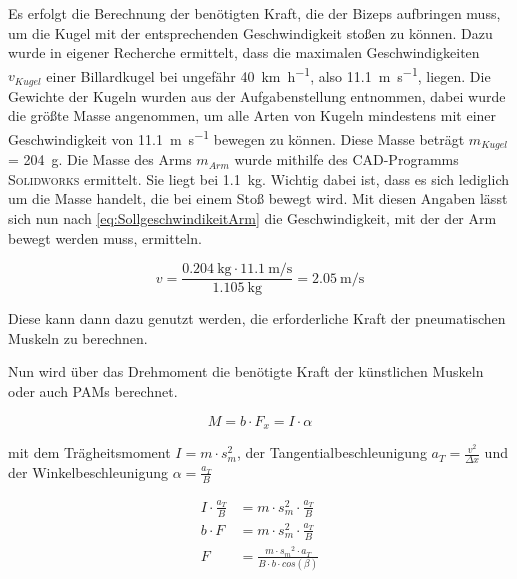 		Es erfolgt die Berechnung der benötigten Kraft, die der Bizeps aufbringen muss, um die Kugel mit der entsprechenden Geschwindigkeit stoßen zu können. 
		Dazu wurde in eigener Recherche ermittelt, dass die maximalen Geschwindigkeiten \(v_{Kugel}\) einer Billardkugel bei ungefähr \SI{40}{\kilo\metre\per\hour}, also \SI{11,1}{\metre\per\second}, liegen.
		Die Gewichte der Kugeln wurden aus der Aufgabenstellung entnommen, dabei wurde die größte Masse angenommen, um alle Arten von Kugeln mindestens mit einer Geschwindigkeit von \SI{11,1}{\metre\per\second} bewegen zu können.
		Diese Masse beträgt \(m_{Kugel}\) = \SI{204}{\gram}.
		Die Masse des Arms \(m_{Arm}\) wurde mithilfe des CAD-Programms \textsc{Solidworks} ermittelt. Sie liegt bei \SI{1,1}{\kilo\gram}.
		Wichtig dabei ist, dass es sich lediglich um die Masse handelt, die bei einem Stoß bewegt wird. 
		Mit diesen Angaben lässt sich nun nach \cref{eq:SollgeschwindikeitArm} die Geschwindigkeit, mit der der Arm bewegt werden muss, ermitteln. 

		\begin{equation}
			v= \frac{\SI{0,204}{\kilogram} \cdot \SI{11,1}{\metre\per\second}}{\SI{1,105}{\kilogram}} = \SI{2,05}{\metre\per\second}
			\label{eq:SollgeschwindikeitArmZahlen}
		\end{equation}

		Diese kann dann dazu genutzt werden, die erforderliche Kraft der pneumatischen Muskeln zu berechnen. \par
		Nun wird über das Drehmoment die benötigte Kraft der künstlichen Muskeln oder auch PAMs berechnet. 

		\begin{equation}
			M = b \cdot F_x = I \cdot \alpha%
			\label{eq:DrehmomentArm}
		\end{equation}

		mit dem Trägheitsmoment \( I = m \cdot s_m^2 \), der Tangentialbeschleunigung \( a_T = \frac{v^2}{\Delta x} \) und der
		Winkelbeschleunigung \( \alpha = \frac{a_T}{B} \) \par\medskip

		\begin{align}
			I \cdot \frac{a_T}{B} &= m \cdot s_m^2 \cdot \frac{a_T}{B} \nonumber\\
			b \cdot F &= m \cdot s_m^2 \cdot \frac{a_T}{B} \nonumber\\
			F &=\frac{m \cdot {s_m}^2 \cdot a_T}{B \cdot b \cdot cos(\beta)}%
			\label{eq:Kraft-PAM}
		\end{align}

